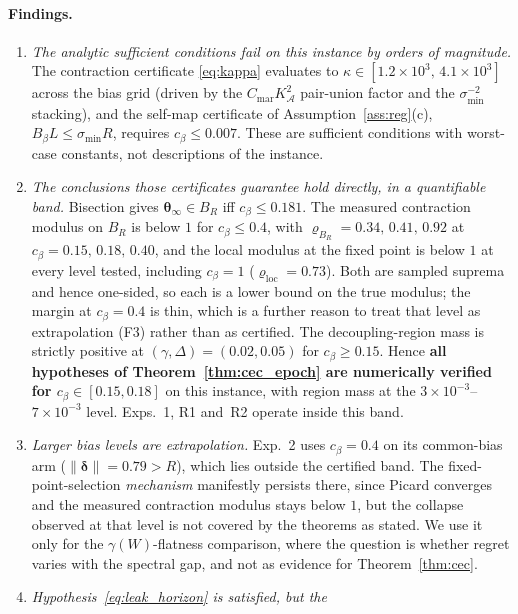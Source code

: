 \documentclass[11pt]{article}
\begin{document}
\paragraph{Findings.}
\begin{enumerate}[(F1)]
\item \emph{The analytic sufficient conditions fail on this instance
by orders of magnitude.}  The contraction certificate
\eqref{eq:kappa} evaluates to $\kappa\in[1.2\times10^3,\,
4.1\times10^3]$ across the bias grid (driven by the
$C_{\mathrm{mar}}K_{\mathcal A}^2$ pair-union factor and the
$\sigma_{\min}^{-2}$ stacking), and the self-map certificate of
Assumption~\ref{ass:reg}(c), $B_\beta L\leq\sigma_{\min}R$, requires
$c_\beta\leq 0.007$.  These are sufficient conditions with worst-case
constants, not descriptions of the instance.
\item \emph{The conclusions those certificates guarantee hold
directly, in a quantifiable band.}  Bisection gives
$\bm\theta_\infty\in B_R$ iff $c_\beta\leq 0.181$. The measured
contraction modulus on $B_R$ is below $1$ for $c_\beta\leq 0.4$, with
$\varrho_{B_R}=0.34,\,0.41,\,0.92$ at $c_\beta=0.15,\,0.18,\,0.40$,
and the local modulus at the fixed point is below $1$ at every level
tested, including $c_\beta=1$ ($\varrho_{\mathrm{loc}}=0.73$).  Both
are sampled suprema and hence one-sided, so each is a lower bound on
the true modulus; the margin at $c_\beta=0.4$ is thin, which is a
further reason to treat that level as extrapolation (F3) rather than
as certified.  The
decoupling-region mass is strictly positive at
$(\gamma,\Delta)=(0.02,0.05)$ for $c_\beta\geq 0.15$.  Hence
\textbf{all hypotheses of Theorem~\ref{thm:cec_epoch} are numerically
verified for $c_\beta\in[0.15,0.18]$} on this instance, with region
mass at the $3\times10^{-3}$--$7\times10^{-3}$ level.  Exps.~1, R1
and~R2 operate inside this band.
\item \emph{Larger bias levels are extrapolation.}  Exp.~2 uses
$c_\beta=0.4$ on its common-bias arm ($\|\bm\delta\|=0.79>R$), which
lies outside the certified band. The fixed-point-selection
\emph{mechanism} manifestly persists there, since Picard converges and
the measured contraction modulus stays below $1$, but the collapse
observed at that level is not covered by the theorems as stated.  We
use it only for the $\gamma(W)$-flatness comparison, where the
question is whether regret varies with the spectral gap, and not as
evidence for Theorem~\ref{thm:cec}.
\item \emph{Hypothesis~\eqref{eq:leak_horizon} is satisfied, but the
}
\end{enumerate}
\end{document}
